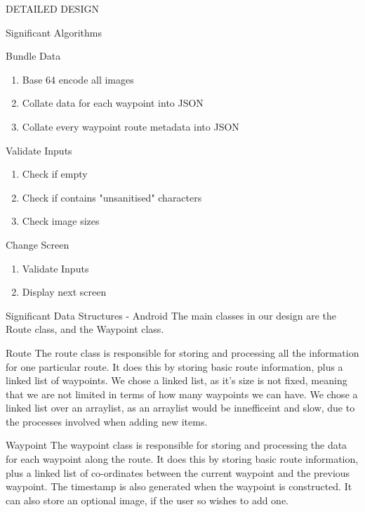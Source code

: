 \documentclass{article}
\begin{document}
\begin{section}{DETAILED DESIGN}
\begin{subsection}{Significant Algorithms}
    \begin{subsubsection}{Bundle Data}
        \begin{enumerate}
            \item{Base 64 encode all images}
            \item{Collate data for each waypoint into JSON}
            \item{Collate every waypoint route metadata into JSON}
        \end{enumerate}
    \end{subsubsection}

    \begin{subsubsection}{Validate Inputs}
        \begin{enumerate}
            \item{Check if empty}
            \item{Check if contains "unsanitised" characters}
            \item{Check image sizes}
        \end{enumerate}
    \end{subsubsection}

    	\begin{subsubsection}{Change Screen}
    	    \begin{enumerate}
    	        \item{Validate Inputs}
    	        \item{Display next screen}
    	    \end{enumerate}
   		\end{subsubsection}
	\end{subsection}
	
	\begin{subsection}{Significant Data Structures - Android}
		The main classes in our design are the Route class, and the Waypoint class. 

		\begin{subsubsection}{Route}
			The route class is responsible for storing and processing all the information for one particular route. It does this by storing basic route information, plus a linked list of waypoints. We chose a linked list, as it's size is not fixed, meaning that we are not limited in terms of how many waypoints we can have. We chose a linked list over an arraylist, as an arraylist would be innefficeint and slow, due to the processes involved when adding new items.
		\end{subsubsection}

		\begin{subsubsection}{Waypoint}
			The waypoint class is responsible for storing and processing the data for each waypoint along the route. It does this by storing basic route information, plus a linked list of co-ordinates between the current waypoint and the previous waypoint. The timestamp is also generated when the waypoint is constructed. It can also store an optional image, if the user so wishes to add one.
		\end{subsubsection}


\end{subsection}
\end{section}
\end{document}
